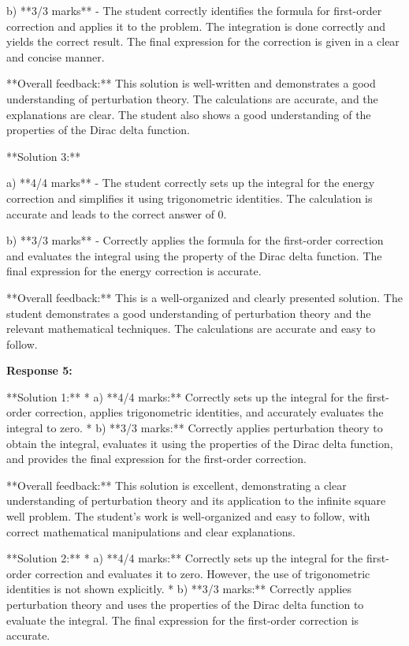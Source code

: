 \documentclass[a4paper,11pt]{article}
\begin{document}
b) **3/3 marks** - The student correctly identifies the formula for first-order correction and applies it to the problem. The integration is done correctly and yields the correct result. The final expression for the correction is given in a clear and concise manner.

**Overall feedback:** This solution is well-written and demonstrates a good understanding of perturbation theory. The calculations are accurate, and the explanations are clear. The student also shows a good understanding of the properties of the Dirac delta function.

**Solution 3:**

a) **4/4 marks** - The student correctly sets up the integral for the energy correction and simplifies it using trigonometric identities. The calculation is accurate and leads to the correct answer of 0.

b) **3/3 marks** - Correctly applies the formula for the first-order correction and evaluates the integral using the property of the Dirac delta function. The final expression for the energy correction is accurate.

**Overall feedback:** This is a well-organized and clearly presented solution. The student demonstrates a good understanding of perturbation theory and the relevant mathematical techniques. The calculations are accurate and easy to follow. 


\textbf{Response 5:}

**Solution 1:**
* a) **4/4 marks:** Correctly sets up the integral for the first-order correction, applies trigonometric identities, and accurately evaluates the integral to zero.
* b) **3/3 marks:** Correctly applies perturbation theory to obtain the integral, evaluates it using the properties of the Dirac delta function, and provides the final expression for the first-order correction.

**Overall feedback:** This solution is excellent, demonstrating a clear understanding of perturbation theory and its application to the infinite square well problem. The student's work is well-organized and easy to follow, with correct mathematical manipulations and clear explanations.

**Solution 2:**
* a) **4/4 marks:** Correctly sets up the integral for the first-order correction and evaluates it to zero. However, the use of trigonometric identities is not shown explicitly.
* b) **3/3 marks:** Correctly applies perturbation theory and uses the properties of the Dirac delta function to evaluate the integral. The final expression for the first-order correction is accurate.
\end{document}
